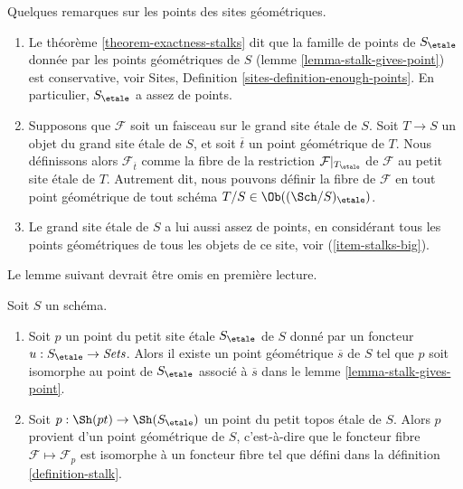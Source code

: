 \begin{remarks}
\label{remarks-enough-points}
Quelques remarques sur les points des sites g\'eom\'etriques.
\begin{enumerate}
\item Le th\'eor\`eme \ref{theorem-exactness-stalks} dit que la famille de points
de $S_\etale$ donn\'ee par les points g\'eom\'etriques de $S$
(lemme \ref{lemma-stalk-gives-point}) est conservative, voir
Sites, Definition \ref{sites-definition-enough-points}.
En particulier, $S_\etale$ a assez de points.
\item Supposons que $\mathcal{F}$ soit un faisceau sur le grand site \'etale
\label{item-stalks-big}
de $S$. Soit $T \to S$ un objet du grand site \'etale de $S$,
et soit $\overline{t}$ un point g\'eom\'etrique de $T$. Nous d\'efinissons alors
$\mathcal{F}_{\overline{t}}$ comme la fibre
de la restriction $\mathcal{F}|_{T_\etale}$ de $\mathcal{F}$
au petit site \'etale de $T$. Autrement dit, nous pouvons d\'efinir
la fibre de $\mathcal{F}$ en tout point g\'eom\'etrique de tout
sch\'ema $T/S \in \Ob((\Sch/S)_\etale)$.
\item Le grand site \'etale de $S$ a lui aussi assez de points, en
consid\'erant tous les points g\'eom\'etriques de tous les objets de ce site, voir
(\ref{item-stalks-big}).
\end{enumerate}
\end{remarks}

\noindent
Le lemme suivant devrait \^etre omis en premi\`ere lecture.

\begin{lemma}
\label{lemma-points-small-etale-site}
Soit $S$ un sch\'ema.
\begin{enumerate}
\item Soit $p$ un point du petit site \'etale
$S_\etale$ de $S$ donn\'e par un foncteur
$u : S_\etale \to \textit{Sets}$.
Alors il existe un point g\'eom\'etrique $\overline{s}$ de $S$ tel que
$p$ soit isomorphe au point de $S_\etale$ associ\'e \`a
$\overline{s}$ dans le
lemme \ref{lemma-stalk-gives-point}.
\item Soit $p : \Sh(pt) \to \Sh(S_\etale)$ un point
du petit topos \'etale de $S$. Alors $p$ provient d'un point g\'eom\'etrique
de $S$, c'est-\`a-dire que le foncteur fibre $\mathcal{F} \mapsto \mathcal{F}_p$
est isomorphe \`a un foncteur fibre tel que d\'efini dans la
d\'efinition \ref{definition-stalk}.
\end{enumerate}
\end{lemma}


